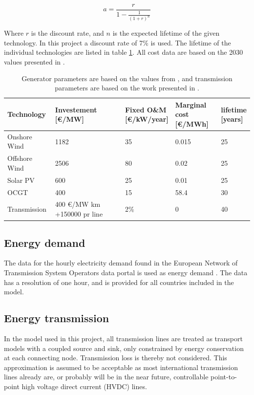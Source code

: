 \begin{equation}\label{eq:annuity}
a = \frac{r}{1 - \frac{1}{(1+r)^n}}
\end{equation}

Where $r$ is the discount rate, and $n$ is the expected lifetime of the given technology. In this project a discount rate of 7\% is used. The lifetime of the individual technologies are listed in table \ref{tab:cost_data}. All cost data are based on the 2030 values presented in \cite{Schroder2013Current}.

\begin{table}[]
	\begin{tabular}{l|llll}
		Technology      & \makecell[c]{Investement \\ {[}€/MW{]}}	& \makecell[c]{Fixed O\&M \\ {[}€/kW/year{]}} & \makecell[c]{Marginal cost \\ {[}€/MWh{]}}	& \makecell[c]{lifetime \\ {[}years{]}} \\ \hline
		Onshore Wind    &       1182  		&   35      &   0.015       &   25       \\
		Offshore Wind	&		2506		&	80		&	0.02		&	25		\\
		Solar PV   		&       600    		&   25      &   0.01    	&   25       \\
		OCGT       		&       400    		&   15      &   58.4        &   30      \\
		Transmission	& 400 €/MW km +150000 pr line & 2\% & 0 		&   40 
	\end{tabular}
	\caption{Generator parameters are based on the values from \cite{Schroder2013Current}, and transmission parameters are based on the work presented in \cite{HAGSPIEL2014654}.}
	\label{tab:cost_data}
\end{table}

\subsection{Energy demand}
The data for the hourly electricity demand found in the European Network of Transmission System Operators data portal is used as energy demand \cite{ENTSO-E}. The data has a resolution of one hour, and is provided for all countries included in the model. 

\subsection{Energy transmission}
In the model used in this project, all transmission lines are treated as transport models with a coupled source and sink, only constrained by energy conservation at each connecting node. Transmission loss is thereby not considered. This approximation is assumed to be acceptable as most international transmission lines already are, or probably will be in the near future, controllable point-to-point high voltage direct current (HVDC) lines. 


